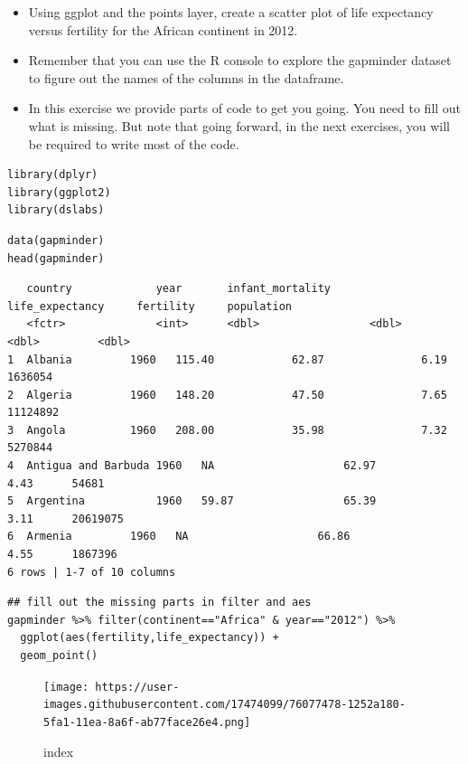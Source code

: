 \documentclass[
]{article}
\providecommand{\tightlist}{%
  \setlength{\itemsep}{0pt}\setlength{\parskip}{0pt}}
\begin{document}
\begin{itemize}
\tightlist
\item
  Using ggplot and the points layer, create a scatter plot of life
  expectancy versus fertility for the African continent in 2012.
\item
  Remember that you can use the R console to explore the gapminder
  dataset to figure out the names of the columns in the dataframe.
\item
  In this exercise we provide parts of code to get you going. You need
  to fill out what is missing. But note that going forward, in the next
  exercises, you will be required to write most of the code.
\end{itemize}

\begin{verbatim}
library(dplyr)
library(ggplot2)
library(dslabs)
\end{verbatim}

\begin{verbatim}
data(gapminder)
head(gapminder)
\end{verbatim}

\begin{verbatim}
   country             year       infant_mortality      life_expectancy     fertility     population
   <fctr>              <int>      <dbl>                 <dbl>               <dbl>         <dbl>
1  Albania         1960   115.40            62.87               6.19      1636054   
2  Algeria         1960   148.20            47.50               7.65      11124892  
3  Angola          1960   208.00            35.98               7.32      5270844   
4  Antigua and Barbuda 1960   NA                    62.97               4.43      54681 
5  Argentina           1960   59.87                 65.39               3.11      20619075  
6  Armenia         1960   NA                    66.86               4.55      1867396   
6 rows | 1-7 of 10 columns
\end{verbatim}

\begin{verbatim}
## fill out the missing parts in filter and aes
gapminder %>% filter(continent=="Africa" & year=="2012") %>%
  ggplot(aes(fertility,life_expectancy)) +
  geom_point()
\end{verbatim}

\begin{figure}
\centering
\texttt{[image: https://user-images.githubusercontent.com/17474099/76077478-1252a180-5fa1-11ea-8a6f-ab77face26e4.png]}
\caption{index}
\end{figure}
\end{document}

